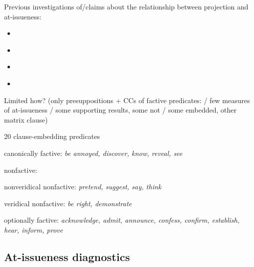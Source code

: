 \documentclass[11pt,fleqn]{article}
\newcommand{\6}{\mbox{$[\hspace*{-.6mm}[$}}
\newcommand{\9}{\mbox{$]\hspace*{-.6mm}]$}}
\begin{document}
Previous investigations of/claims about the relationship between projection and at-issueness:

\begin{itemize}

\item \citealt{brst-salt10,brst-ar}

\item \citealt{xue-onea11}

\item \citealt{tbd-variability}

\item \citealt{koev2018}

\end{itemize}

Limited how? (only presuppositions + CCs of factive predicates: \citealt{degen-tonhauser-factive} / few measures of at-issueness / some supporting results, some not / some embedded, other matrix clause)

\begin{exe}
\ex\label{pred} 20 clause-embedding predicates 

\begin{xlist}

\ex canonically factive: {\em be annoyed, discover, know, reveal, see}

\ex nonfactive:

\begin{xlist}

\ex nonveridical nonfactive: {\em pretend, suggest, say, think}

\ex veridical nonfactive: {\em be right, demonstrate}

\end{xlist}

\ex optionally factive: {\em acknowledge, admit, announce, confess, confirm, establish, hear, inform, prove}

\end{xlist}

\end{exe}

\subsection{At-issueness diagnostics}\label{s:ai-diagnostics}
\end{document}
